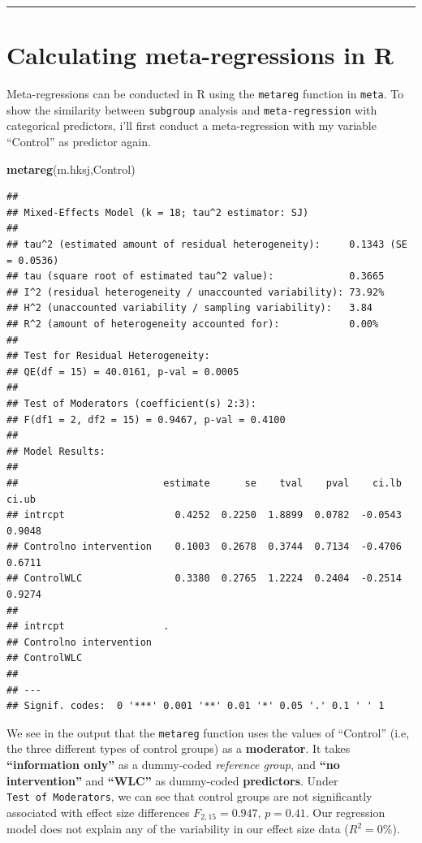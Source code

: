 \documentclass[]{book}
\newenvironment{Shaded}{\begin{snugshade}}{\end{snugshade}}
\newcommand{\KeywordTok}[1]{\textcolor[rgb]{0.13,0.29,0.53}{\textbf{#1}}}
\newcommand{\NormalTok}[1]{#1}
\begin{document}
\begin{center}\rule{0.5\linewidth}{\linethickness}\end{center}

\hypertarget{calculating-meta-regressions-in-r}{%
\section{Calculating meta-regressions in R}\label{calculating-meta-regressions-in-r}}

Meta-regressions can be conducted in R using the \texttt{metareg} function in \texttt{meta}. To show the similarity between \texttt{subgroup} analysis and \texttt{meta-regression} with categorical predictors, i'll first conduct a meta-regression with my variable ``Control'' as predictor again.

\begin{Shaded}
\begin{Highlighting}[]
\KeywordTok{metareg}\NormalTok{(m.hksj,Control)}
\end{Highlighting}
\end{Shaded}

\begin{verbatim}
## 
## Mixed-Effects Model (k = 18; tau^2 estimator: SJ)
## 
## tau^2 (estimated amount of residual heterogeneity):     0.1343 (SE = 0.0536)
## tau (square root of estimated tau^2 value):             0.3665
## I^2 (residual heterogeneity / unaccounted variability): 73.92%
## H^2 (unaccounted variability / sampling variability):   3.84
## R^2 (amount of heterogeneity accounted for):            0.00%
## 
## Test for Residual Heterogeneity: 
## QE(df = 15) = 40.0161, p-val = 0.0005
## 
## Test of Moderators (coefficient(s) 2:3): 
## F(df1 = 2, df2 = 15) = 0.9467, p-val = 0.4100
## 
## Model Results:
## 
##                         estimate      se    tval    pval    ci.lb   ci.ub
## intrcpt                   0.4252  0.2250  1.8899  0.0782  -0.0543  0.9048
## Controlno intervention    0.1003  0.2678  0.3744  0.7134  -0.4706  0.6711
## ControlWLC                0.3380  0.2765  1.2224  0.2404  -0.2514  0.9274
##                          
## intrcpt                 .
## Controlno intervention   
## ControlWLC               
## 
## ---
## Signif. codes:  0 '***' 0.001 '**' 0.01 '*' 0.05 '.' 0.1 ' ' 1
\end{verbatim}

We see in the output that the \texttt{metareg} function uses the values of ``Control'' (i.e, the three different types of control groups) as a \textbf{moderator}. It takes \textbf{``information only''} as a dummy-coded \emph{reference group}, and \textbf{``no intervention''} and \textbf{``WLC''} as dummy-coded \textbf{predictors}. Under \texttt{Test\ of\ Moderators}, we can see that control groups are not significantly associated with effect size differences \(F_{2,15}=0.947\), \(p=0.41\). Our regression model does not explain any of the variability in our effect size data (\(R^2=0\%\)).
\end{document}
